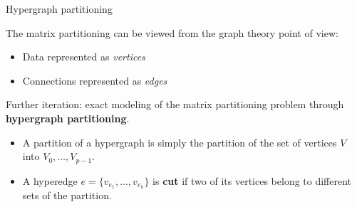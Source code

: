 \begin{frame}{Hypergraph partitioning}

The matrix partitioning can be viewed from the graph theory point of view:

\begin{itemize}
	\item Data represented as \emph{vertices}
	\item Connections represented as \emph{edges}
\end{itemize}

Further iteration: exact modeling of the matrix partitioning problem through \textbf{hypergraph partitioning}.

\begin{itemize}
	\item A partition of a hypergraph is simply the partition of the set of vertices $V$ into $V_0,\dots,V_{p-1}$.
	\item A hyperedge $e = \{v_{e_1},\dots,v_{e_k}\}$ is \textbf{cut} if two of its vertices belong to different sets of the partition.
\end{itemize}

\end{frame}


